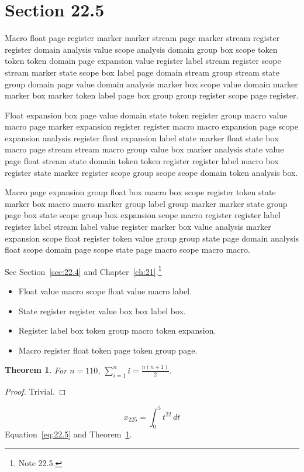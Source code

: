\documentclass[11pt,twoside]{book}
\newtheorem{theorem}{Theorem}[chapter]
\begin{document}
\section{Section 22.5}\label{sec:22.5}
Macro float page register marker marker stream page marker stream register register domain analysis value scope analysis domain group box scope token token token domain page expansion value register label stream register scope stream marker state scope box label page domain stream group stream state group domain page value domain analysis marker box scope value domain marker marker box marker token label page box group group register scope page register.

Float expansion box page value domain state token register group macro value macro page marker expansion register register macro macro expansion page scope expansion analysis register float expansion label state marker float state box macro page stream stream macro group value box marker analysis state value page float stream state domain token token register register label macro box register state marker register scope group scope scope domain token analysis box.

Macro page expansion group float box macro box scope register token state marker box macro macro marker group label group marker marker state group page box state scope group box expansion scope macro register register label register label stream label value register marker box value analysis marker expansion scope float register token value group group state page domain analysis float scope domain page scope state page macro scope macro macro.

See Section~\ref{sec:22.4} and Chapter~\ref{ch:21}.\footnote{Note 22.5.}
\begin{itemize}\item Float value macro scope float value macro label.\item State register register value box box label box.\item Register label box token group macro token expansion.\item Macro register float token page token group page.\end{itemize}
\begin{theorem}\label{thm:22.5}For $n=110$, $\sum_{i=1}^{n}i=\frac{n(n+1)}{2}$.\end{theorem}\begin{proof}Trivial.\end{proof}
\begin{equation}x_{225}=\int_0^{5}t^{22}\,dt\label{eq:22.5}\end{equation} Equation~\eqref{eq:22.5} and Theorem~\ref{thm:22.5}.
\end{document}
